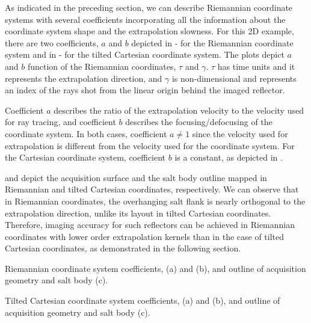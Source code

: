 As indicated in the preceding section, we can describe Riemannian coordinate systems with several coefficients incorporating all the information about the coordinate system shape and the extrapolation slowness. For this 2D example, there are two coefficients, $a$ and $b$ depicted in - for the Riemannian coordinate system and in - for the tilted Cartesian coordinate system. The plots depict $a$ and $b$ function of the Riemannian coordinates, $\tau$ and $\gamma$. $\tau$ has time units and it represents the extrapolation direction, and $\gamma$ is non-dimensional and represents an index of the rays shot from the linear origin behind the imaged reflector.
\par
Coefficient $a$ describes the ratio of the extrapolation velocity to the velocity used for ray tracing, and coefficient $b$ describes the focusing/defocusing of the coordinate system. In both cases, coefficient $a \ne 1$ since the velocity used for extrapolation is different from the velocity used for the coordinate system. For the Cartesian coordinate system, coefficient $b$ is a constant, as depicted in .

 and  depict the acquisition surface and the salt body outline mapped in Riemannian and tilted Cartesian coordinates, respectively. We can observe that in Riemannian coordinates, the overhanging salt flank is nearly orthogonal to the extrapolation direction, unlike its layout in tilted Cartesian coordinates. Therefore, imaging accuracy for such reflectors can be achieved in Riemannian coordinates with lower order extrapolation kernels than in the case of tilted Cartesian coordinates, as demonstrated in the following section.

{Riemannian coordinate system coefficients, (a) and (b), and outline of acquisition geometry and salt body (c).}

{Tilted Cartesian coordinate system coefficients, (a) and (b), and outline of acquisition geometry and salt body (c).
}

